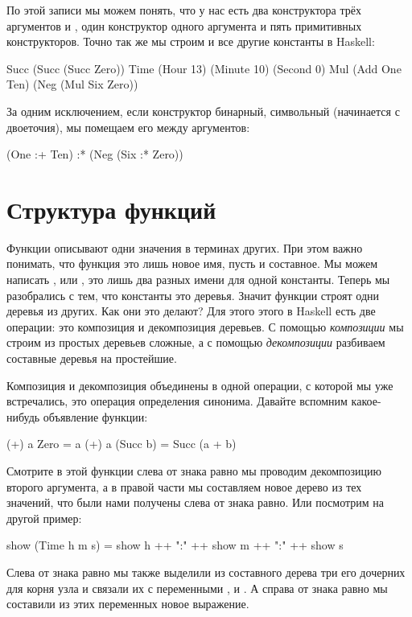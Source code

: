 По этой записи мы можем понять, что у нас есть два конструктора трёх
аргументов  и , один конструктор одного аргумента  и
пять примитивных конструкторов. Точно так же мы строим и все другие
константы в Haskell:


\begin{code}
Succ (Succ (Succ Zero))
Time (Hour 13) (Minute 10) (Second 0)
Mul (Add One Ten) (Neg (Mul Six Zero))
\end{code}

За одним исключением, если конструктор бинарный, символьный (начинается
с двоеточия), мы помещаем его между аргументов:


\begin{code}
(One :+ Ten) :* (Neg (Six :* Zero))
\end{code}

\section{Структура функций}

Функции описывают одни значения в терминах других. При этом важно
понимать, что функция это лишь новое имя, пусть и составное. Мы можем
написать , или , это лишь два разных имени для одной
константы. Теперь мы разобрались с тем, что константы это деревья.
Значит функции строят одни деревья из других. Как они это делают? Для
этого этого в Haskell есть две операции: это композиция и декомпозиция
деревьев. С помощью \emph{композиции} мы строим из простых деревьев
сложные, а с помощью \emph{декомпозиции} разбиваем составные деревья на
простейшие.

Композиция и декомпозиция объединены в одной операции, с которой мы уже
встречались, это операция определения синонима. Давайте вспомним
какое-нибудь объявление функции:


\begin{code}
(+) a  Zero      = a
(+) a  (Succ b)  = Succ (a + b)
\end{code}

Смотрите в этой функции слева от знака равно мы проводим декомпозицию
второго аргумента, а в правой части мы составляем новое дерево из тех
значений, что были нами получены слева от знака равно. Или посмотрим на
другой пример:


\begin{code}
show (Time h m s) = show h ++ ":" ++ show m ++ ":" ++ show s
\end{code}

Слева от знака равно мы также выделили из составного дерева
 три его дочерних для корня узла и связали их с
переменными ,  и . А справа от знака равно мы
составили из этих переменных новое выражение.

